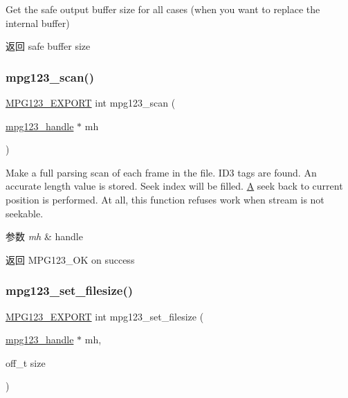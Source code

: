 Get the safe output buffer size for all cases (when you want to replace the internal buffer) \begin{DoxyReturn}{返回}
safe buffer size 
\end{DoxyReturn}
\mbox{\label{group__mpg123__status_ga229cf48b0e7020403e423824f6b9ac2c}} 
\subsubsection{\texorpdfstring{mpg123\+\_\+scan()}{mpg123\_scan()}}
{\footnotesize\ttfamily \hyperlink{mpg123_8h_a2ba98cfba3f760879df70e755b2a61cc}{M\+P\+G123\+\_\+\+E\+X\+P\+O\+RT} int mpg123\+\_\+scan (\begin{DoxyParamCaption}\item[{\hyperlink{group__mpg123__init_ga6728e2839a395f3a07d4514da659faca}{mpg123\+\_\+handle} $\ast$}]{mh }\end{DoxyParamCaption})}

Make a full parsing scan of each frame in the file. I\+D3 tags are found. An accurate length value is stored. Seek index will be filled. \hyperlink{struct_a}{A} seek back to current position is performed. At all, this function refuses work when stream is not seekable. 
\begin{DoxyParams}{参数}
{\em mh} & handle \\
\hline
\end{DoxyParams}
\begin{DoxyReturn}{返回}
M\+P\+G123\+\_\+\+OK on success 
\end{DoxyReturn}
\mbox{\label{group__mpg123__status_gad0301e80dbc3f48e47e27d39cd328755}} 
\subsubsection{\texorpdfstring{mpg123\+\_\+set\+\_\+filesize()}{mpg123\_set\_filesize()}}
{\footnotesize\ttfamily \hyperlink{mpg123_8h_a2ba98cfba3f760879df70e755b2a61cc}{M\+P\+G123\+\_\+\+E\+X\+P\+O\+RT} int mpg123\+\_\+set\+\_\+filesize (\begin{DoxyParamCaption}\item[{\hyperlink{group__mpg123__init_ga6728e2839a395f3a07d4514da659faca}{mpg123\+\_\+handle} $\ast$}]{mh,  }\item[{off\+\_\+t}]{size }\end{DoxyParamCaption})}


